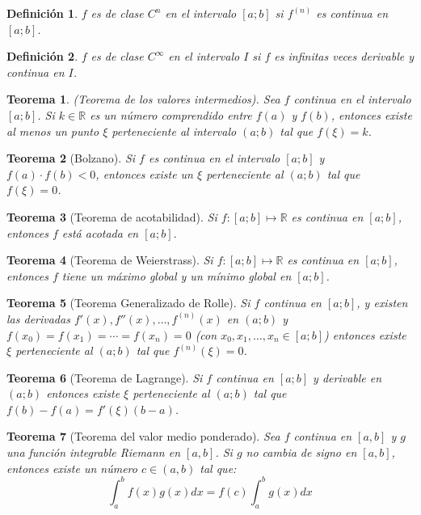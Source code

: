\documentclass[12pt]{article}
\newtheorem{Def}{Definici\'on}
\newtheorem{Teo}{Teorema}
\begin{document}
\begin{Def}$f$ es de clase $C^n$ en el intervalo $[a;b]$ si $f^{(n)}$ es continua en $[a;b]$.
\end{Def}

\begin{Def}$f$ es de clase $C^\infty$ en el intervalo $I$ si $f$ es infinitas veces derivable y continua en $I$.
\end{Def}

\begin{Teo} (Teorema de los valores intermedios). Sea $f$ continua en el intervalo $[a;b]$. Si $k \in \mathbb{R}$ es un número comprendido entre $f(a)$ y $f(b)$, entonces existe al menos un punto $\xi$ perteneciente al intervalo $(a;b)$ tal que $f(\xi) = k$.
\end{Teo}

\begin{Teo}[Bolzano]Si $f$ es continua en el intervalo $[a;b]$ y $f(a) \cdot f(b) < 0$, entonces existe un $\xi$ perteneciente al $(a;b)$ tal que $f(\xi) = 0$.
\end{Teo}

\begin{Teo}[Teorema de acotabilidad] Si $f : [a;b] \mapsto \mathbb{R}$ es continua en $[a;b]$, entonces $f$ está acotada en $[a;b]$.
\end{Teo}

\begin{Teo}[Teorema de Weierstrass] Si $f : [a;b] \mapsto \mathbb{R}$ es continua en $[a;b]$, entonces $f$ tiene un máximo global y un mínimo global en $[a;b]$.
\end{Teo}

\begin{Teo}[Teorema Generalizado de Rolle] Si $f$ continua en $[a;b]$, y existen las derivadas $f'(x), f''(x), \ldots, f^{(n)}(x)$ en $(a;b)$ y $f(x_0) = f(x_1) = \cdots = f(x_n) = 0$ (con $x_0, x_1, \ldots, x_n \in [a;b]$) entonces existe $\xi$ perteneciente al $(a;b)$ tal que $f^{(n)}(\xi) = 0$.
\end{Teo}

\begin{Teo}[Teorema de Lagrange] Si $f$ continua en $[a;b]$ y derivable en $(a;b)$ entonces existe $\xi$ perteneciente al $(a;b)$ tal que $f(b) - f(a) = f'(\xi)(b - a)$.
\end{Teo}

\begin{Teo}[Teorema del valor medio ponderado] Sea $f$ continua en $[a,b]$ y $g$ una función integrable Riemann en $[a,b]$. Si $g$ no cambia de signo en $[a,b]$, entonces existe un número $c \in (a,b)$ tal que:
$$\int_a^b f(x)g(x)dx = f(c) \int_a^b g(x)dx$$
\end{Teo}
\end{document}
